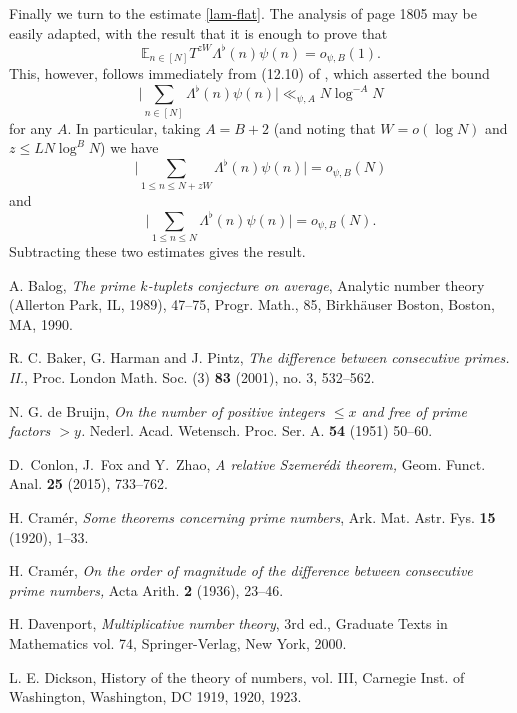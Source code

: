 \documentclass[12pt]{amsart}
\numberwithin{equation}{section}  %
\theoremstyle{remark}
\theoremstyle{plain}
\numberwithin{equation}{section}
\newcommand{\E}{\mathbb{E}}  %
\renewcommand{\le}{\leqslant}
\renewcommand{\leq}{\leqslant}
\renewcommand{\(}{\left(}
\renewcommand{\)}{\right)}
\begin{document}
Finally we turn to the estimate \eqref{lam-flat}. The analysis of page 1805 may be easily adapted, with the result that it is enough to prove that 
\[ \E_{n \in [N]} T^{zW} \Lambda^{\flat}(n) \psi(n) = o_{\psi, B}(1).\]
This, however, follows immediately from (12.10) of \cite{gt-linearprimes}, which asserted the bound
\[ \bigg|\sum_{n \in [N]} \Lambda^{\flat}(n) \psi(n)\bigg| \ll_{\psi, A} N \log^{-A} N\] for any $A$. In particular, taking $A = B + 2$ (and noting that $W = o(\log N)$ and $z \leq LN\log^B N$) we have
\[ \bigg|\sum_{1 \leq n \leq N + zW} \Lambda^{\flat}(n) \psi(n)\bigg| = o_{\psi,B}(N)\]
and
\[ \bigg|\sum_{1 \leq n \leq N} \Lambda^{\flat}(n)\psi(n)\bigg| = o_{\psi, B}(N).\]
Subtracting these two estimates gives the result.

%


\begin{thebibliography}{999}

A.  Balog, \emph{The prime $k$-tuplets conjecture on average}, Analytic number theory (Allerton Park, IL, 1989), 47–75, Progr. Math., 85, Birkh\"auser Boston, Boston, MA, 1990.

 R. C. Baker, G. Harman and J. Pintz,
{\it The difference between consecutive primes. II.},
Proc. London Math. Soc. (3) {\bf 83} (2001), no. 3, 532--562.

 N. G. de Bruijn, \emph{On the number of positive 
integers $\le x$ and free of prime factors $>y$.}
Nederl. Acad. Wetensch. Proc. Ser. A. \textbf{54} (1951) 50--60. 


 D.~Conlon, J.~Fox and Y.~Zhao, \emph{A relative Szemer\'edi theorem,} Geom. Funct. Anal. \textbf{25} (2015), 733--762.

  H. Cram\'er,  \emph{Some theorems concerning prime numbers},
Ark. Mat. Astr. Fys. {\bf 15} (1920), 1--33.

 H. Cram\'er, \emph{On the order of magnitude of the difference
between consecutive prime numbers,} Acta Arith. \textbf{2} (1936),
23--46.

 H. Davenport, {\it Multiplicative number theory}, 3rd ed.,
Graduate Texts in Mathematics vol. 74, Springer-Verlag, New York, 2000.

 L. E. Dickson, History of the theory of numbers, vol. III, Carnegie Inst. of Washington,
Washington, DC 1919, 1920, 1923.


\end{thebibliography}
\end{document}

